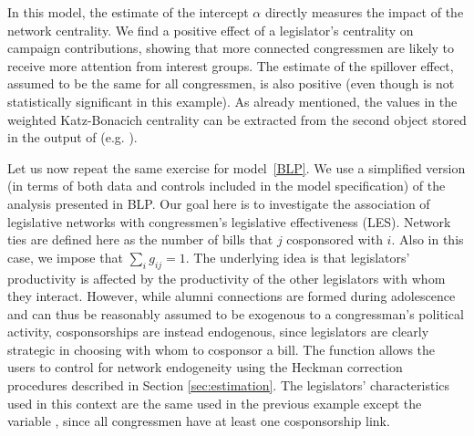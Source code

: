 \documentclass[nojss]{jss}
\begin{document}
In this model, the estimate of the intercept $\alpha$ directly measures the impact of the network centrality. We find a positive effect of a legislator's centrality on campaign contributions, showing that more connected congressmen are likely to receive more attention from interest groups. The estimate of the spillover effect, assumed to be the same for all congressmen, is also positive (even though is not statistically significant in this example).
As already mentioned, the values in the weighted Katz-Bonacich centrality can be extracted from the second object stored in the output of  (e.g. ).

Let us now repeat the same exercise for model~\ref{BLP}. We use a simplified version (in terms of both data and controls included in the model specification) of the analysis presented in BLP. Our goal here is to investigate the association of legislative networks with congressmen's legislative effectiveness (LES). Network ties are defined here as the number
of bills that $j$ cosponsored with $i$. Also in this case, we impose that $\sum_{i}g_{ij}=1$. The underlying idea is that legislators' productivity is affected by the productivity of the other legislators with whom they interact. However, while alumni connections are formed during adolescence and can thus be reasonably assumed to be exogenous to a congressman's political activity, cosponsorships are instead endogenous, since legislators are clearly strategic in choosing with whom to cosponsor a bill. The function  allows the users to control for network endogeneity using the Heckman correction procedures described in Section \ref{sec:estimation}. The legislators' characteristics used in this context are the same used in the previous example except the variable , since all congressmen have at least one cosponsorship link.
\end{document}
